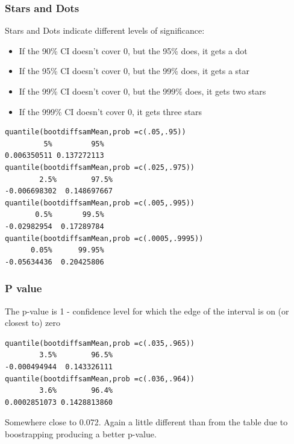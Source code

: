 \documentclass{beamer}
\newcommand{\0}{\mathbf{0}}
\begin{document}
\begin{frame}[fragile]
\frametitle{Stars and Dots}
\small
Stars and Dots indicate different levels of significance:
\begin{itemize}
\item If the 90\% CI doesn't cover 0, but the 95\% does, it gets a dot
\item If the 95\% CI doesn't cover 0, but the 99\% does, it gets a star
\item If the 99\% CI doesn't cover 0, but the 999\% does, it gets two stars
\item If the 999\% CI doesn't cover 0, it gets three stars
\end{itemize}

\begin{verbatim}
quantile(bootdiffsamMean,prob =c(.05,.95))
         5%         95% 
0.006350511 0.137272113 
quantile(bootdiffsamMean,prob =c(.025,.975))
        2.5%        97.5% 
-0.006698302  0.148697667 
quantile(bootdiffsamMean,prob =c(.005,.995))
       0.5%       99.5% 
-0.02982954  0.17289784 
quantile(bootdiffsamMean,prob =c(.0005,.9995))
      0.05%      99.95% 
-0.05634436  0.20425806 
\end{verbatim}

\end{frame}

\begin{frame}[fragile]
\frametitle{P value}
\small
The p-value is 1 - confidence level for which the edge of the interval is on (or closest to) zero

\begin{verbatim}
quantile(bootdiffsamMean,prob =c(.035,.965))
        3.5%        96.5% 
-0.000494944  0.143326111 
quantile(bootdiffsamMean,prob =c(.036,.964))
        3.6%        96.4% 
0.0002851073 0.1428813860 
\end{verbatim}

Somewhere close to 0.072. Again a little different than from the table due to boostrapping producing a better p-value. 

\end{frame}


\end{document}
